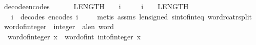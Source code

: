 \begin{isabellebody}
{\isafoldproof}%
%
\isadelimproof
\isanewline
%
\endisadelimproof
\isanewline
{}\isamarkupfalse%
\ decode{\isacharunderscore}{\kern0pt}encode{\isacharunderscore}{\kern0pt}s{}{}{\isacharcolon}{\kern0pt}\isanewline
\ \ \ {\isachardoublequoteopen}{\isacharminus}{\kern0pt}\ {\isacharparenleft}{\kern0pt}{}\ {\isacharcircum}{\kern0pt}\ {\isacharparenleft}{\kern0pt}LENGTH{\isacharparenleft}{\kern0pt}{}{}{\isacharparenright}{\kern0pt}\ {\isacharminus}{\kern0pt}\ {}{\isacharparenright}{\kern0pt}{\isacharparenright}{\kern0pt}\ {\isasymle}\ i{\isachardoublequoteclose}\isanewline
\ \ \ \ \ {\isachardoublequoteopen}i\ {\isacharless}{\kern0pt}\ {}\ {\isacharcircum}{\kern0pt}\ {\isacharparenleft}{\kern0pt}LENGTH{\isacharparenleft}{\kern0pt}{}{}{\isacharparenright}{\kern0pt}\ {\isacharminus}{\kern0pt}\ {}{\isacharparenright}{\kern0pt}{\isachardoublequoteclose}\isanewline
\ \ \ {\isachardoublequoteopen}i\ {\isacharequal}{\kern0pt}\ decode{\isacharunderscore}{\kern0pt}s{}{}\ {\isacharparenleft}{\kern0pt}encode{\isacharunderscore}{\kern0pt}s{}{}\ i{\isacharparenright}{\kern0pt}{\isachardoublequoteclose}\ \isanewline
%
\isadelimproof
\ \ %
\endisadelimproof
%
\isatagproof
{}\isamarkupfalse%
\ {\isacharparenleft}{\kern0pt}metis\ assms\ len{\isacharunderscore}{\kern0pt}signed\ sint{\isacharunderscore}{\kern0pt}of{\isacharunderscore}{\kern0pt}int{\isacharunderscore}{\kern0pt}eq\ word{\isacharunderscore}{\kern0pt}rcat{\isacharunderscore}{\kern0pt}rsplit{\isacharparenright}{\kern0pt}%
\endisatagproof
{\isafoldproof}%
%
\isadelimproof
\isanewline
%
\endisadelimproof
\isanewline
{}\isamarkupfalse%
\ word{\isacharunderscore}{\kern0pt}of{\isacharunderscore}{\kern0pt}integer\ {\isacharcolon}{\kern0pt}{\isacharcolon}{\kern0pt}\ {\isachardoublequoteopen}integer\ {\isasymRightarrow}\ {\isacharprime}{\kern0pt}a{\isacharcolon}{\kern0pt}{\isacharcolon}{\kern0pt}len\ word{\isachardoublequoteclose}\isanewline
\ \ \isanewline
\ \ {\isachardoublequoteopen}word{\isacharunderscore}{\kern0pt}of{\isacharunderscore}{\kern0pt}integer\ x\ {\isasymequiv}\ word{\isacharunderscore}{\kern0pt}of{\isacharunderscore}{\kern0pt}int\ {\isacharparenleft}{\kern0pt}int{\isacharunderscore}{\kern0pt}of{\isacharunderscore}{\kern0pt}integer\ x{\isacharparenright}{\kern0pt}{\isachardoublequoteclose}\isanewline
\isanewline
{}\isamarkupfalse%

\end{isabellebody}
